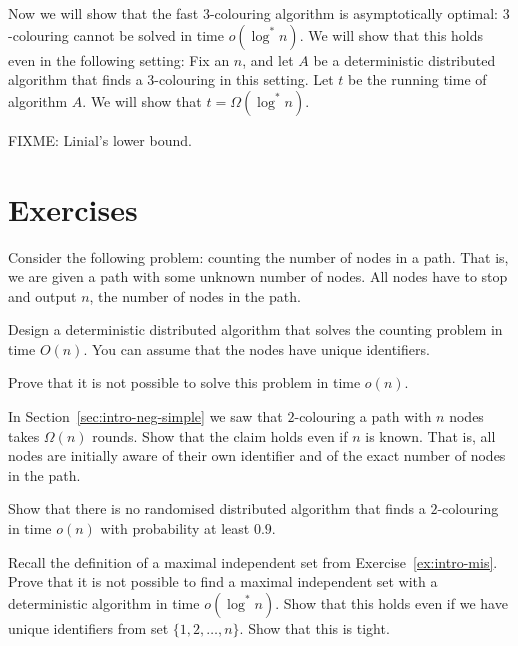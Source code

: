Now we will show that the fast $3$-colouring algorithm is asymptotically optimal: $3$-colouring cannot be solved in time $o(\log^* n)$. We will show that this holds even in the following setting:
Fix an $n$, and let $A$ be a deterministic distributed algorithm that finds a $3$-colouring in this setting. Let $t$ be the running time of algorithm $A$. We will show that $t = \Omega(\log^* n)$.

FIXME: Linial's lower bound.


\section{Exercises}

\begin{ex}[counting]
    Consider the following problem: counting the number of nodes in a path. That is, we are given a path with some unknown number of nodes. All nodes have to stop and output $n$, the number of nodes in the path.
    \begin{subex}
        \item Design a deterministic distributed algorithm that solves the counting problem in time $O(n)$. You can assume that the nodes have unique identifiers.
        \item Prove that it is not possible to solve this problem in time $o(n)$.
    \end{subex}
\end{ex}

\begin{ex}[known $n$]
    In Section~\ref{sec:intro-neg-simple} we saw that $2$-colouring a path with $n$ nodes takes $\Omega(n)$    rounds. Show that the claim holds even if $n$ is known. That is, all nodes are initially aware of their own identifier and of the exact number of nodes in the path.
\end{ex}

\begin{ex}
    Show that there is no randomised distributed algorithm that finds a $2$-colouring in time $o(n)$ with probability at least $0.9$.
\end{ex}

\begin{ex}
    Recall the definition of a maximal independent set from Exercise~\ref{ex:intro-mis}. Prove that it is not possible to find a maximal independent set with a deterministic algorithm in time $o(\log^* n)$. Show that this holds even if we have unique identifiers from set $\{1,2,\dotsc,n\}$. Show that this is tight.
\end{ex}

